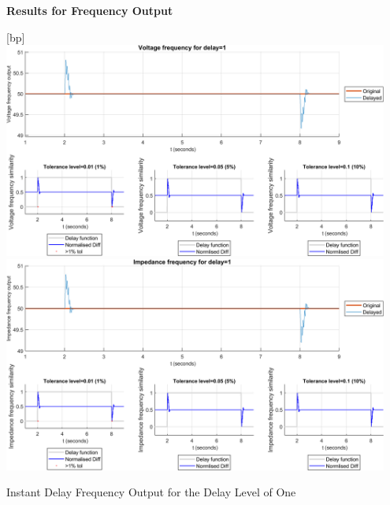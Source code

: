 {\newpage \textbf{Results for Frequency Output}
\begin{floatingfigure}[p]{\textwidth}[bp]
    \includegraphics[width=0.95\textwidth]{PMUsim-figures/DelayOf_1/Instant_vFrequency.png}    
  \includegraphics[width=0.95\textwidth]{PMUsim-figures/DelayOf_1/Instant_iFrequency.png}    
    \label{fig:PMUsim_One_Frequency}
    \caption{Instant Delay Frequency Output for the Delay Level of One}
\end{floatingfigure}

}
